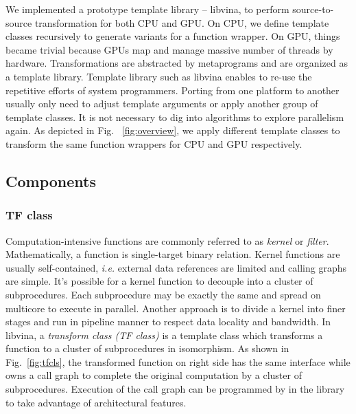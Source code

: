 \documentclass[10pt, conference, compsocconf]{IEEEtran}
\begin{document}
We implemented a prototype template library -- libvina, to perform source-to-source
transformation for both CPU and GPU. On CPU, we define template
classes recursively to generate variants for a function wrapper. On GPU, things became trivial because GPUs map and
manage massive number of threads by hardware. Transformations are
abstracted by metaprograms and are organized as a template
library. Template library such as libvina enables to re-use
the repetitive efforts of system programmers.  Porting
from one platform to another usually  only need to adjust
template arguments or apply another group of template classes. It is not necessary to
dig into algorithms to explore parallelism again. As depicted in
Fig. ~\ref{fig:overview}, we apply different template classes to
transform the same function wrappers for CPU and GPU respectively.



\subsection{Components}
\subsubsection{TF class}
Computation-intensive functions are commonly referred to as
\emph{kernel} or \emph{filter}. Mathematically, a function is
single-target binary relation. Kernel functions are usually
self-contained, \textit{i.e.} external data references are limited and
calling graphs are simple. It's possible for a kernel function to
decouple into a cluster of subprocedures. Each subprocedure may be
exactly the same and spread on multicore to execute in
parallel.  Another approach is to divide a kernel into finer stages
and run in pipeline manner to respect data locality and bandwidth. In
libvina, a \emph{transform class (TF class)} is a template class which
transforms a function to a cluster of subprocedures in isomorphism. As
shown in Fig.~\ref{fig:tfcls}, the transformed function on right side
has the same interface while owns a call graph to complete the
original computation by a cluster of subprocedures. Execution of the
call graph can be programmed by in the library to take advantage of
architectural features.
\end{document}
